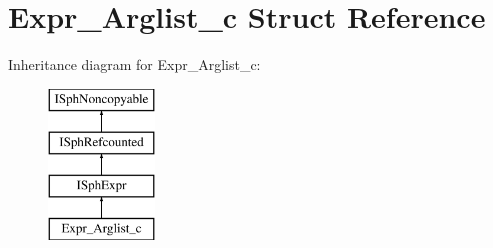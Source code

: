 \hypertarget{structExpr__Arglist__c}{\section{Expr\-\_\-\-Arglist\-\_\-c Struct Reference}
\label{structExpr__Arglist__c}
}
Inheritance diagram for Expr\-\_\-\-Arglist\-\_\-c\-:\begin{figure}[H]
\begin{center}
\leavevmode
\includegraphics[height=4.000000cm]{structExpr__Arglist__c}
\end{center}
\end{figure}
